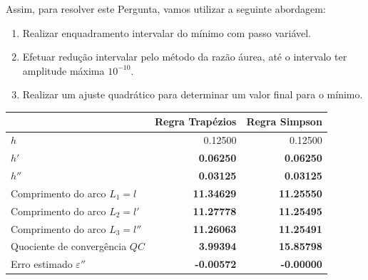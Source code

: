 Assim, para resolver este Pergunta, vamos utilizar a seguinte abordagem:
\begin{enumerate}
    \item Realizar enquadramento intervalar do mínimo com passo variável.
    \item Efetuar redução intervalar pelo método da razão áurea, até o intervalo ter amplitude máxima $10^{-10}$.
    \item Realizar um ajuste quadrático para determinar um valor final para o mínimo.
\end{enumerate}




\begin{center} \begin{tabular}{l | r | r}
    & Regra Trapézios & Regra Simpson \\ \hline
    $h  $ & 0.12500 & 0.12500 \\
    $h' $ & \textbf{0.06250} & \textbf{0.06250} \\
    $h''$ & \textbf{0.03125} & \textbf{0.03125} \\
    Comprimento do arco $L_1=l  $ & \textbf{11.34629} & \textbf{11.25550} \\
    Comprimento do arco $L_2=l' $ & \textbf{11.27778} & \textbf{11.25495} \\
    Comprimento do arco $L_3=l''$ & \textbf{11.26063} & \textbf{11.25491} \\
    Quociente de convergência $QC$ & \textbf{3.99394} & \textbf{15.85798} \\
    Erro estimado $\varepsilon''$ & \textbf{-0.00572} & \textbf{-0.00000}
\end{tabular} \end{center}


